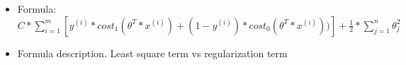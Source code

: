 \begin{itemize}
	\item Formula: $C*\displaystyle\sum_{i=1}^{m} [y^{(i)} * cost_{1}(\theta^{T} * x^{(i)}) + (1-y^{(i)}) * cost_{0}(\theta^{T} * x^{(i)}))] + \frac{1}{2} * \displaystyle\sum_{j=1}^{n} \theta^{2}_{j}$
	\item Formula description. Least square term vs regularization term
\end{itemize}